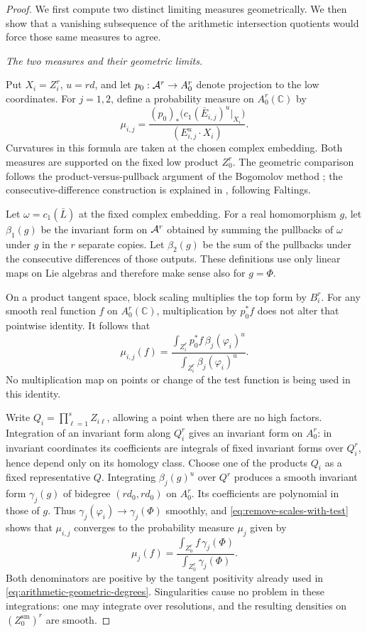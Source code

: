 \begin{proof}
We first compute two distinct limiting measures geometrically.  We then
show that a vanishing subsequence of the arithmetic intersection
quotients would force those same measures to agree.

\emph{The two measures and their geometric limits.}

Put \(X_i=Z_i^r\), \(u=rd\), and let
\(p_0:\mathcal A^r\to A_0^r\) denote projection to the low coordinates.
For \(j=1,2\), define a probability measure on \(A_0^r(\mathbb C)\) by
\[
 \mu_{i,j}
 =\frac{(p_0)_*\big(c_1(\bar E_{i,j})^u\big|_{X_i}\big)}
 {(E_{i,j}^u\cdot X_i)}.
\]
Curvatures in this formula are taken at the chosen complex embedding.
Both measures are supported on the fixed low product \(Z_0^r\).
The geometric comparison follows the product-versus-pullback argument
of the Bogomolov method \cite[Section~4]{Ullmo1998}; the
consecutive-difference construction is explained in
\cite[Section~3]{Zhang1998ICM}, following Faltings.

Let \(\omega=c_1(\bar L)\) at the fixed complex embedding.  For a real
homomorphism \(g\), let \(\beta_1(g)\) be the invariant form on
\(\mathcal A^r\) obtained by summing the pullbacks of \(\omega\) under \(g\)
in the \(r\) separate copies.  Let \(\beta_2(g)\) be the sum of the
pullbacks under the consecutive differences of those outputs.  These
definitions use only linear maps on Lie algebras and therefore make sense
also for \(g=\Phi\).

On a product tangent space, block scaling multiplies the top form by
\(B_i^r\).  For any smooth real function \(f\) on
\(A_0^r(\mathbb C)\), multiplication by \(p_0^*f\) does not alter
that pointwise identity.  It follows that
\begin{equation}\label{eq:remove-scales-with-test}
 \mu_{i,j}(f)
 =\frac{\displaystyle\int_{Z_i^r}p_0^*f\,
                            \beta_j(\varphi_i)^u}
        {\displaystyle\int_{Z_i^r}\beta_j(\varphi_i)^u}.
\end{equation}
No multiplication map on points or change of the test function is being
used in this identity.

Write \(Q_i=\prod_{\ell=1}^s Z_{i\ell}\), allowing a point when
there are no high factors.  Integration of an invariant form along
\(Q_i^r\) gives an invariant form on \(A_0^r\): in invariant
coordinates its coefficients are integrals of fixed invariant forms
over \(Q_i^r\), hence depend only on its homology class.  Choose one
of the products \(Q_i\) as a fixed representative \(Q\).  Integrating
\(\beta_j(g)^u\) over \(Q^r\) produces a smooth invariant form
\(\gamma_j(g)\) of bidegree \((rd_0,rd_0)\) on \(A_0^r\).
Its coefficients are polynomial in those of \(g\).  Thus
\(\gamma_j(\varphi_i)\to\gamma_j(\Phi)\) smoothly, and
\eqref{eq:remove-scales-with-test} shows that \(\mu_{i,j}\) converges
to the probability measure \(\mu_j\) given by
\[
 \mu_j(f)
 =\frac{\displaystyle\int_{Z_0^r}f\,\gamma_j(\Phi)}
        {\displaystyle\int_{Z_0^r}\gamma_j(\Phi)}.
\]
Both denominators are positive by the tangent positivity already used
in \eqref{eq:arithmetic-geometric-degrees}.  Singularities cause no
problem in these integrations: one may integrate over resolutions,
and the resulting densities on \((Z_0^{\mathrm{sm}})^r\) are smooth.


\end{proof}
